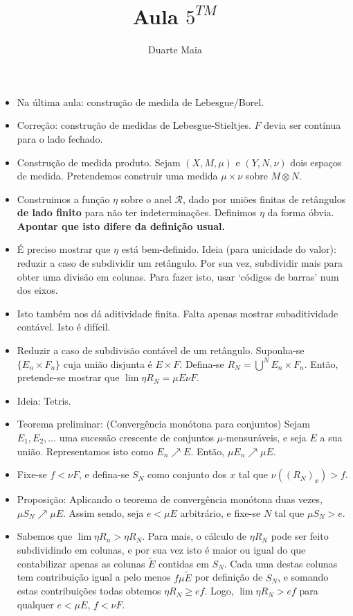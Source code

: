 \documentclass{article}
\title{Aula $5^{TM}$}
\author{Duarte Maia}
\date{}
\begin{document}
\maketitle

\begin{itemize}
\item Na última aula: construção de medida de Lebesgue/Borel.
\item Correção: construção de medidas de Lebesgue-Stieltjes. $F$ devia ser contínua para o lado fechado.
\item Construção de medida produto. Sejam $(X,M,\mu)$ e $(Y,N,\nu)$ dois espaços de medida. Pretendemos construir uma medida $\mu \times \nu$ sobre $M \otimes N$.
\item Construimos a função $\eta$ sobre o anel $\mathcal R$, dado por uniões finitas de retângulos \textbf{de lado finito} para não ter indeterminações. Definimos $\eta$ da forma óbvia. \textbf{Apontar que isto difere da definição usual.}
\item É preciso mostrar que $\eta$ está bem-definido. Ideia (para unicidade do valor): reduzir a caso de subdividir um retângulo. Por sua vez, subdividir mais para obter uma divisão em colunas. Para fazer isto, usar `códigos de barras' num dos eixos.
\item Isto também nos dá aditividade finita. Falta apenas mostrar subaditividade contável. Isto é difícil.
\item Reduzir a caso de subdivisão contável de um retângulo. Suponha-se $\{E_n\times F_n\}$ cuja união disjunta é $E \times F$. Defina-se $R_N = \bigcup^N E_n \times F_n$. Então, pretende-se mostrar que $\lim \eta R_N = \mu E \nu F$.
\item Ideia: Tetris.
\item Teorema preliminar: (Convergência monótona para conjuntos) Sejam $E_1, E_2, \dots$ uma sucessão crescente de conjuntos $\mu$-mensuráveis, e seja $E$ a sua união. Representamos isto como $E_n \nearrow E$. Então, $\mu E_n \nearrow \mu E$.
\item Fixe-se $f < \nu F$, e defina-se $S_N$ como conjunto dos $x$ tal que $\nu((R_N)_x) > f$.
\item Proposição: Aplicando o teorema de convergência monótona duas vezes, $\mu S_N \nearrow \mu E$. Assim sendo, seja $e < \mu E$ arbitrário, e fixe-se $N$ tal que $\mu S_N > e$.
\item Sabemos que $\lim \eta R_n > \eta R_N$. Para mais, o cálculo de $\eta R_N$ pode ser feito subdividindo em colunas, e por sua vez isto é maior ou igual do que contabilizar apenas as colunas $\tilde E$ contidas em $S_N$. Cada uma destas colunas tem contribuição igual a pelo menos $f \mu \tilde E$ por definição de $S_N$, e somando estas contribuições todas obtemos $\eta R_N \geq e f$. Logo, $\lim \eta R_N > e f$ para qualquer $e<\mu E$, $f < \nu F$.

\end{itemize}
\end{document}
